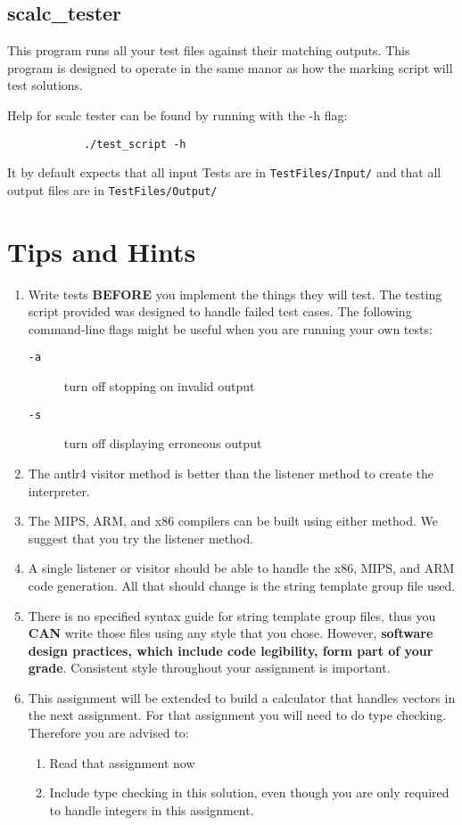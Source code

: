 \documentclass{article}
\begin{document}
	\subsection{scalc\_tester}

		This program runs all your test files against their matching outputs. This program is designed to operate in the
		same manor as how the marking script will test solutions.

		Help for scalc tester can be found by running with the -h flag:

		\begin{lstlisting}
			./test_script -h
		\end{lstlisting}

		It by default expects that all input Tests are in \texttt{TestFiles/Input/} and that  all output files are in
		\texttt{TestFiles/Output/}




\section{Tips and Hints}

	\begin{enumerate}
		\item Write tests \textbf{BEFORE} you implement the things they will test. The testing script provided was
		designed to handle failed test cases.  The following command-line flags might be useful when you are running your own tests:
		\begin{description}
			\item[{\tt -a}] turn off stopping on invalid output
			\item[{\tt -s}]  turn off displaying erroneous output
		\end{description}
		\item The antlr4 visitor method is better than the listener method to create the interpreter.
		\item The MIPS, ARM, and x86 compilers can be built using either method. We suggest that you try the listener method.
		\item A single listener or visitor should be able to handle the x86, MIPS, and ARM code generation. All that should
		change is the string template group file used.
		\item There is no specified syntax guide for string template group files, thus you \textbf{CAN} write those files using
		any style that you chose. However, \textbf{software design practices, which include code legibility, form part of your grade}.
		Consistent style throughout your assignment is important.
		\item This assignment will be extended to build a calculator that handles vectors in the next assignment. For that assignment
		you will need to do type checking. Therefore you are advised to:
		\begin {enumerate}
			\item Read that assignment now
			\item Include type checking in this solution, even though you are only
			required to handle integers in this assignment.
		\end {enumerate}
	\end{enumerate}
\end{document}
